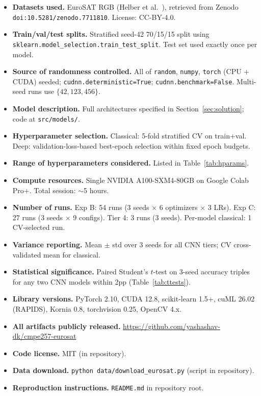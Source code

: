 \documentclass[10pt,letterpaper]{article}
\begin{document}
\begin{itemize}[leftmargin=2em]
    \item \textbf{Datasets used.} EuroSAT RGB (Helber et al.~\cite{helber2019}), retrieved from Zenodo \texttt{doi:10.5281/zenodo.7711810}. License: CC-BY-4.0.
    \item \textbf{Train/val/test splits.} Stratified seed-42 70/15/15 split using \texttt{sklearn.model\_selection.train\_test\_split}. Test set used exactly once per model.
    \item \textbf{Source of randomness controlled.} All of \texttt{random}, \texttt{numpy}, \texttt{torch} (CPU + CUDA) seeded; \texttt{cudnn.deterministic{=}True}; \texttt{cudnn.benchmark{=}False}. Multi-seed runs use $\{42, 123, 456\}$.
    \item \textbf{Model description.} Full architectures specified in Section~\ref{sec:solution}; code at \texttt{src/models/}.
    \item \textbf{Hyperparameter selection.} Classical: 5-fold stratified CV on train+val. Deep: validation-loss-based best-epoch selection within fixed epoch budgets.
    \item \textbf{Range of hyperparameters considered.} Listed in Table~\ref{tab:hparams}.
    \item \textbf{Compute resources.} Single NVIDIA A100-SXM4-80GB on Google Colab Pro+. Total session: $\sim$5 hours.
    \item \textbf{Number of runs.} Exp B: 54 runs (3 seeds $\times$ 6 optimizers $\times$ 3 LRs). Exp C: 27 runs (3 seeds $\times$ 9 configs). Tier 4: 3 runs (3 seeds). Per-model classical: 1 CV-selected run.
    \item \textbf{Variance reporting.} Mean $\pm$ std over 3 seeds for all CNN tiers; CV cross-validated mean for classical.
    \item \textbf{Statistical significance.} Paired Student's $t$-test on 3-seed accuracy triples for any two CNN models within 2pp (Table~\ref{tab:ttests}).
    \item \textbf{Library versions.} PyTorch 2.10, CUDA 12.8, scikit-learn 1.5+, cuML 26.02 (RAPIDS), Kornia 0.8, torchvision 0.25, OpenCV 4.x.
    \item \textbf{All artifacts publicly released.} \url{https://github.com/yashashav-dk/cmpe257-eurosat}
    \item \textbf{Code license.} MIT (in repository).
    \item \textbf{Data download.} \texttt{python data/download\_eurosat.py} (script in repository).
    \item \textbf{Reproduction instructions.} \texttt{README.md} in repository root.
\end{itemize}
\end{document}
